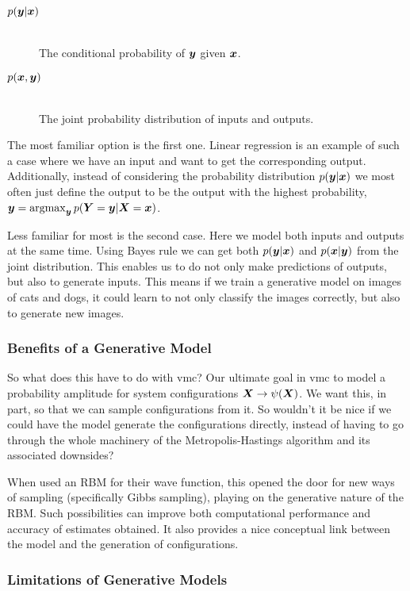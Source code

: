 \documentclass[Thesis.tex]{subfiles}
\begin{document}
\begin{description}
\item[$p(\bm{y} | \bm{x})$]\hfill\\
  The conditional probability of $\bm{y}$ given $\bm{x}$.
\item[$p(\bm{x}, \bm{y})$] \hfill\\
  The joint probability distribution of inputs and outputs.
\end{description}
The most familiar option is the first one. Linear regression is an example of
such a case where we have an input and want to get the corresponding output.
Additionally, instead of considering the probability distribution $p(\bm{y}|\bm{x})$ we
most often just define the output to be the output with the highest probability,
$\bm{y} = \operatorname*{argmax}_{\bm{y}}p(\bm{Y} = \bm{y} | \bm{X} = \bm{x})$.

Less familiar for most is the second case. Here we model both inputs and outputs
at the same time. Using Bayes rule we can get both $p(\bm{y}|\bm{x})$ and $p(\bm{x} |
\bm{y})$ from the joint distribution. This enables us to do not only make predictions of
outputs, but also to generate inputs. This means if we train a generative model
on images of cats and dogs, it could learn to not only classify the images
correctly, but also to generate new images.

\subsubsection{Benefits of a Generative Model}

So what does this have to do with \gls{vmc}? Our ultimate
goal in \gls{vmc} to model a probability amplitude for system configurations
$\bm{X}\rightarrow \psi(\bm{X})$. We want this, in part, so that we can sample
configurations from it. So wouldn't it be nice if we could have the model
generate the configurations directly, instead of having to go through the whole
machinery of the Metropolis-Hastings algorithm and its associated downsides?

When \textcite{Carleo602} used an RBM for their wave function, this opened the
door for new ways of sampling (specifically Gibbs sampling), playing on the
generative nature of the RBM. Such possibilities can improve both computational
performance and accuracy of estimates obtained. It also provides a nice
conceptual link between the model and the generation of configurations.

\subsubsection{Limitations of Generative Models}
\end{document}
